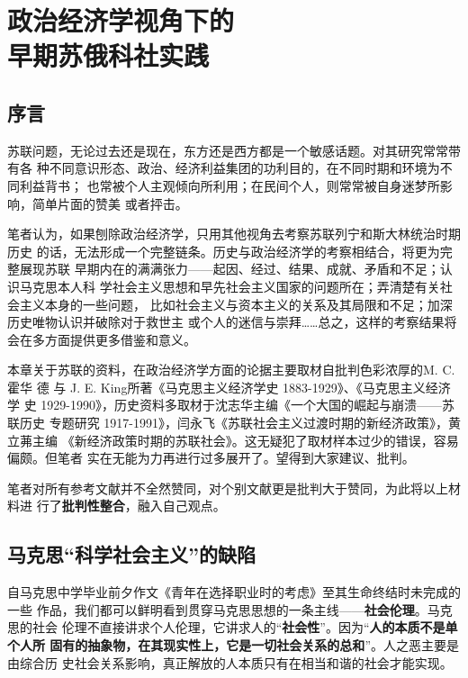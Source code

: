 \chapter[早期苏俄科社实践]{政治经济学视角下的\\早期苏俄科社实践}
\label{chap:russiachina}

\section{序言}

苏联问题，无论过去还是现在，东方还是西方都是一个敏感话题。对其研究常常带有各
种不同意识形态、政治、经济利益集团的功利目的，在不同时期和环境为不同利益背书；
也常被个人主观倾向所利用；在民间个人，则常常被自身迷梦所影响，简单片面的赞美
或者抨击。

笔者认为，如果刨除政治经济学，只用其他视角去考察苏联列宁和斯大林统治时期历史
的话，无法形成一个完整链条。历史与政治经济学的考察相结合，将更为完整展现苏联
早期内在的满满张力——起因、经过、结果、成就、矛盾和不足；认识马克思本人科
学社会主义思想和早先社会主义国家的问题所在；弄清楚有关社会主义本身的一些问题，
比如社会主义与资本主义的关系及其局限和不足；加深历史唯物认识并破除对于救世主
或个人的迷信与崇拜……总之，这样的考察结果将会在多方面提供更多借鉴和意义。

本章关于苏联的资料，在政治经济学方面的论据主要取材自批判色彩浓厚的M. C. 霍华
德 与 J. E. King所著《马克思主义经济学史 1883-1929》、《马克思主义经济学
史 1929-1990》，历史资料多取材于沈志华主编《一个大国的崛起与崩溃——苏联历史
专题研究 1917-1991》，闫永飞《苏联社会主义过渡时期的新经济政策》，黄立茀主编
《新经济政策时期的苏联社会》。这无疑犯了取材样本过少的错误，容易偏颇。但笔者
实在无能为力再进行过多展开了。望得到大家建议、批判。

笔者对所有参考文献并不全然赞同，对个别文献更是批判大于赞同，为此将以上材料进
行了\textbf{批判性整合}，融入自己观点。

\section{马克思“科学社会主义”的缺陷}
\label{sec:marxkexue}

自马克思中学毕业前夕作文《青年在选择职业时的考虑》至其生命终结时未完成的一些
作品，我们都可以鲜明看到贯穿马克思思想的一条主线——\textbf{社会伦理}。马克思的社会
伦理不直接讲求个人伦理，它讲求人的“\textbf{社会性}”。因为“\textbf{人的本质不是单个人所
  固有的抽象物，在其现实性上，它是一切社会关系的总和}”。人之恶主要是由综合历
史社会关系影响，真正解放的人本质只有在相当和谐的社会才能实现。

